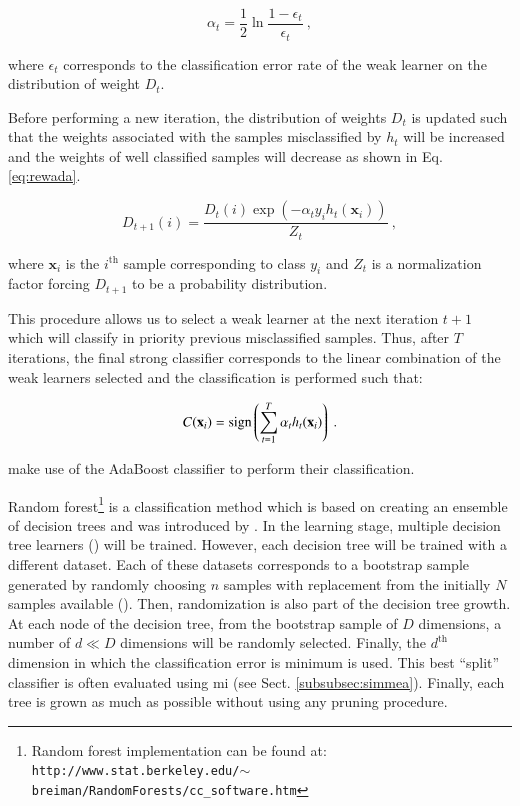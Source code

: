 \begin{enumerate}[leftmargin=*]
\begin{equation}
	\alpha_t = \frac{1}{2} \ln \frac{1 - \epsilon_t}{\epsilon_t} \ ,
	\label{eq:wclssada}
\end{equation}

\noindent where $\epsilon_t$ corresponds to the classification error rate of the weak learner on the distribution of weight $D_t$.

Before performing a new iteration, the distribution of weights $D_t$ is updated such that the weights associated with the samples misclassified by $h_t$ will be increased and the weights of well classified samples will decrease as shown in Eq. \eqref{eq:rewada}.

\begin{equation}
	D_{t+1}(i) = \frac{ D_t(i) \exp \left( -\alpha_t y_i h_{t}(\mathbf{x}_{i} ) \right) }{ Z_t  } \ ,
	\label{eq:rewada} 
\end{equation}

\noindent where $\mathbf{x}_i$ is the $i^{\text{th}}$ sample corresponding to class $y_i$ and $Z_t$ is a normalization factor forcing $D_{t+1}$ to be a probability distribution. 

This procedure allows us to select a weak learner at the next iteration $t+1$ which will classify in priority previous misclassified samples. Thus, after $T$ iterations, the final strong classifier corresponds to the linear combination of the weak learners selected and the classification is performed such that:

\begin{equation}
	C(\mathbf{x}_i) = \operatorname*{sign} \left( \sum_{t=1}^{T} \alpha_t h_t(\mathbf{x}_i) \right) \ .
	\label{eq:strclaada}
\end{equation}

\cite{Lopes2011} make use of the AdaBoost classifier to perform their classification.

Random forest\footnote{Random forest implementation can be found at: \texttt{http://www.stat.\allowbreak berkeley.edu/$\sim$breiman/RandomForests/cc\_software.htm}} is a classification method which is based on creating an ensemble of decision trees and was introduced by \cite{Breiman2001}. In the learning stage, multiple decision tree learners (\cite{Breiman1984}) will be trained. However, each decision tree will be trained with a different dataset. Each of these datasets corresponds to a bootstrap sample generated by randomly choosing $n$ samples with replacement from the initially $N$ samples available (\cite{Efron1979}). Then, randomization is also part of the decision tree growth. At each node of the decision tree, from the bootstrap sample of $D$ dimensions, a number of $d \ll D$ dimensions will be randomly selected. Finally, the $d^{\text{th}}$ dimension in which the classification error is minimum is used. This best ``split'' classifier is often evaluated using \ac{mi} (see Sect. \ref{subsubsec:simmea}). Finally, each tree is grown as much as possible without using any pruning procedure.


\end{enumerate}
